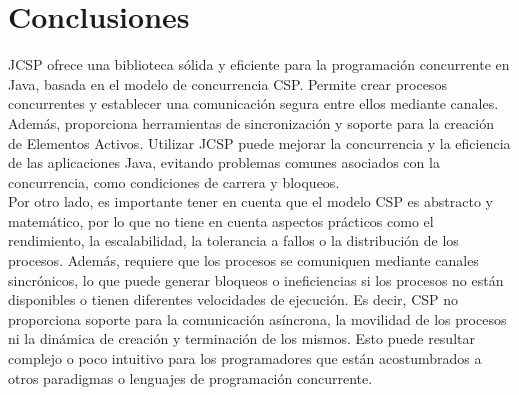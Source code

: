 \section*{Conclusiones}
JCSP ofrece una biblioteca sólida y eficiente para la programación concurrente en Java, basada en el modelo de concurrencia CSP. Permite crear procesos concurrentes y establecer una comunicación segura entre ellos mediante canales. Además, proporciona herramientas de sincronización y soporte para la creación de Elementos Activos. Utilizar JCSP puede mejorar la concurrencia y la eficiencia de las aplicaciones Java, evitando problemas comunes asociados con la concurrencia, como condiciones de carrera y bloqueos.\\
Por otro lado, es importante tener en cuenta que el modelo CSP es abstracto y matemático, por lo que no tiene en cuenta aspectos prácticos como el rendimiento, la escalabilidad, la tolerancia a fallos o la distribución de los procesos. Además, requiere que los procesos se comuniquen mediante canales sincrónicos, lo que puede generar bloqueos o ineficiencias si los procesos no están disponibles o tienen diferentes velocidades de ejecución. Es decir, CSP no proporciona soporte para la comunicación asíncrona, la movilidad de los procesos ni la dinámica de creación y terminación de los mismos. Esto puede resultar complejo o poco intuitivo para los programadores que están acostumbrados a otros paradigmas o lenguajes de programación concurrente.